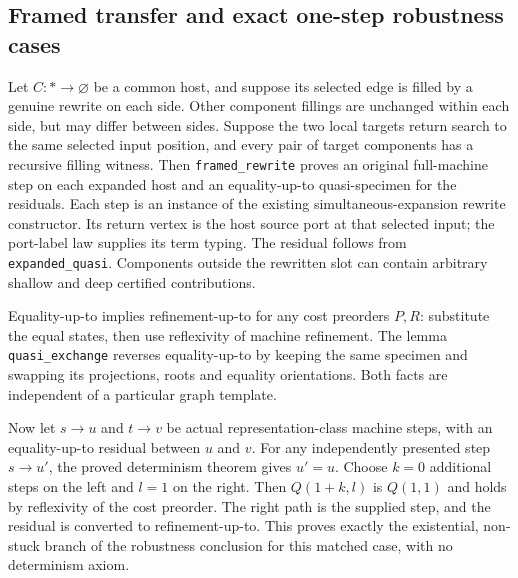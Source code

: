 \subsection{Framed transfer and exact one-step robustness cases}
Let $C:*\to\varnothing$ be a common host, and suppose its selected edge is
filled by a genuine rewrite on each side. Other component fillings are
unchanged within each side, but may differ between sides. Suppose the two
local targets return search to the same selected input position, and every
pair of target components has a recursive filling witness. Then
\texttt{framed\_rewrite} proves an original full-machine step on each expanded
host and an equality-up-to quasi-specimen for the residuals. Each step is an
instance of the existing simultaneous-expansion rewrite constructor. Its
return vertex is the host source port at that selected input; the port-label
law supplies its term typing. The residual follows from
\texttt{expanded\_quasi}. Components outside the rewritten slot can contain
arbitrary shallow and deep certified contributions.


Equality-up-to implies refinement-up-to for any cost preorders $P,R$:
substitute the equal states, then use reflexivity of machine refinement.
The lemma \texttt{quasi\_exchange} reverses equality-up-to by keeping the same
specimen and swapping its projections, roots and equality orientations.
Both facts are independent of a particular graph template.


Now let $s\to u$ and $t\to v$ be actual representation-class machine steps,
with an equality-up-to residual between $u$ and $v$. For any independently
presented step $s\to u'$, the proved determinism theorem gives $u'=u$.
Choose $k=0$ additional steps on the left and $l=1$ on the right. Then
$Q(1+k,l)$ is $Q(1,1)$ and holds by reflexivity of the cost preorder. The
right path is the supplied step, and the residual is converted to
refinement-up-to. This proves exactly the existential, non-stuck branch of
the robustness conclusion for this matched case, with no determinism axiom.


